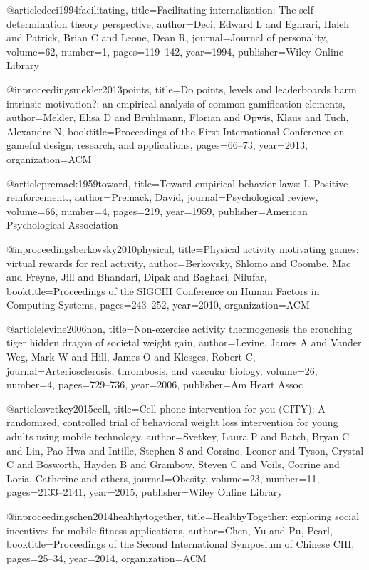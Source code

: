 @article{deci1994facilitating,
  title={Facilitating internalization: The self-determination theory perspective},
  author={Deci, Edward L and Eghrari, Haleh and Patrick, Brian C and Leone, Dean R},
  journal={Journal of personality},
  volume={62},
  number={1},
  pages={119--142},
  year={1994},
  publisher={Wiley Online Library}
}

@inproceedings{mekler2013points,
  title={Do points, levels and leaderboards harm intrinsic motivation?: an empirical analysis of common gamification elements},
  author={Mekler, Elisa D and Br{\"u}hlmann, Florian and Opwis, Klaus and Tuch, Alexandre N},
  booktitle={Proceedings of the First International Conference on gameful design, research, and applications},
  pages={66--73},
  year={2013},
  organization={ACM}
}

@article{premack1959toward,
  title={Toward empirical behavior laws: I. Positive reinforcement.},
  author={Premack, David},
  journal={Psychological review},
  volume={66},
  number={4},
  pages={219},
  year={1959},
  publisher={American Psychological Association}
}

@inproceedings{berkovsky2010physical,
  title={Physical activity motivating games: virtual rewards for real activity},
  author={Berkovsky, Shlomo and Coombe, Mac and Freyne, Jill and Bhandari, Dipak and Baghaei, Nilufar},
  booktitle={Proceedings of the SIGCHI Conference on Human Factors in Computing Systems},
  pages={243--252},
  year={2010},
  organization={ACM}
}

@article{levine2006non,
  title={Non-exercise activity thermogenesis the crouching tiger hidden dragon of societal weight gain},
  author={Levine, James A and Vander Weg, Mark W and Hill, James O and Klesges, Robert C},
  journal={Arteriosclerosis, thrombosis, and vascular biology},
  volume={26},
  number={4},
  pages={729--736},
  year={2006},
  publisher={Am Heart Assoc}
}

@article{svetkey2015cell,
  title={Cell phone intervention for you (CITY): A randomized, controlled trial of behavioral weight loss intervention for young adults using mobile technology},
  author={Svetkey, Laura P and Batch, Bryan C and Lin, Pao-Hwa and Intille, Stephen S and Corsino, Leonor and Tyson, Crystal C and Bosworth, Hayden B and Grambow, Steven C and Voils, Corrine and Loria, Catherine and others},
  journal={Obesity},
  volume={23},
  number={11},
  pages={2133--2141},
  year={2015},
  publisher={Wiley Online Library}
}

@inproceedings{chen2014healthytogether,
  title={HealthyTogether: exploring social incentives for mobile fitness applications},
  author={Chen, Yu and Pu, Pearl},
  booktitle={Proceedings of the Second International Symposium of Chinese CHI},
  pages={25--34},
  year={2014},
  organization={ACM}
}

